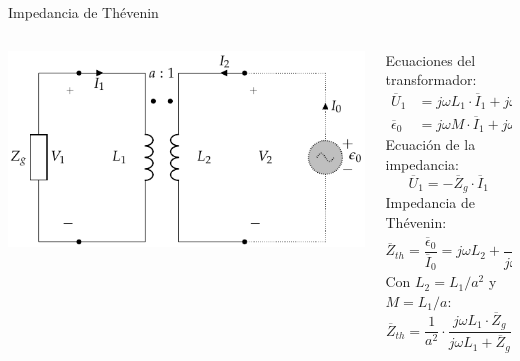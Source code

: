 \documentclass[xcolor={usenames,svgnames,dvipsnames}]{beamer}
\begin{document}
\begin{frame}[label={sec:org91a9d47}]{Impedancia de Thévenin}
\begin{columns}
\begin{column}{0.4\columnwidth}
\begin{center}
\includegraphics[width=.9\linewidth]{../figs/Trafo_Perfecto_ImpedanciaPrimario.pdf}
\end{center}
\end{column}
\begin{column}{0.6\columnwidth}
Ecuaciones del transformador:
\begin{align*}
  \overline{U}_1 &= j \omega L_1 \cdot \overline{I}_1 + j \omega M \cdot\overline{I}_0\\
  \overline{\epsilon}_0 &= j \omega M \cdot \overline{I}_1 + j \omega L_2 \cdot \overline{I}_0
\end{align*}
Ecuación de la impedancia:
\[
  \overline{U}_1 = - \overline{Z}_g \cdot \overline{I}_1
\]
Impedancia de Thévenin:
\[
  \overline{Z}_{th} = \frac{\overline{\epsilon}_0}{\overline{I}_0} = j\omega L_2 + \frac{\omega^2 M^2}{j\omega L_1 + \overline{Z}_g}
\]
Con \(L_2 = L_1/a^2\) y \(M = L_1/a\):
\[
  \overline{Z}_{th} = \frac{1}{a^2} \cdot \frac{j \omega L_1 \cdot \overline{Z}_g}{j\omega L_1 + \overline{Z}_g}
\]
\end{column}
\end{columns}
\end{frame}
\end{document}
